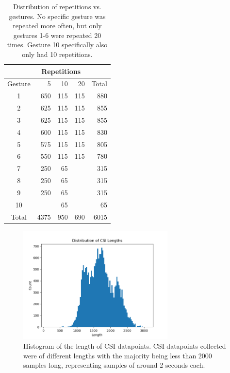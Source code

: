 \begin{table}[tbp]
	\centering
	\begin{tabular}{@{}crrrr@{}}
		\toprule
		& \multicolumn{3}{c}{Repetitions} & \multicolumn{1}{l}{} \\ \midrule
		Gesture & 5         & 10       & 20       & Total                \\
		1       & 650       & 115      & 115      & 880                  \\
		2       & 625       & 115      & 115      & 855                  \\
		3       & 625       & 115      & 115      & 855                  \\
		4       & 600       & 115      & 115      & 830                  \\
		5       & 575       & 115      & 115      & 805                  \\
		6       & 550       & 115      & 115      & 780                  \\
		7       & 250       & 65       &          & 315                  \\
		8       & 250       & 65       &          & 315                  \\
		9       & 250       & 65       &          & 315                  \\
		10      &           & 65       &          & 65                   \\ \midrule
		Total   & 4375      & 950      & 690      & 6015                 \\ \bottomrule
	\end{tabular}
	\caption{Distribution of repetitions vs. gestures. No specific gesture was repeated more often, but only gestures 1-6 were repeated 20 times. Gesture 10 specifically also only had 10 repetitions.}
\end{table}

\begin{figure}
	\centering
	\includegraphics[width=0.7\textwidth]{figures/csi_length_distribution}
	\caption{Histogram of the length of CSI datapoints. CSI datapoints collected were of different lengths with the majority being less than 2000 samples long, representing samples of around 2 seconds each.}
\end{figure}